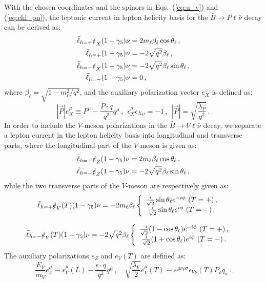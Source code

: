 \documentclass[prd,preprint,superscriptaddress,amsmath,amssymb]{revtex4}
\begin{document}
With the chosen coordinates and the spinors in Eqs.~(\ref{eq:u_v}) and (\ref{eq:chi_pn}),  the  leptonic current in lepton helicity basis for the $\bar B\to P \ell \bar\nu$ decay can be derived as: 
 \begin{align}
 \bar\ell_{h=+} \slashed{e}_X (1- \gamma_5)  \nu &= 2 m_\ell \beta_\ell \cos\theta_\ell\,, \nonumber \\
 \bar\ell_{h=+}  (1- \gamma_5)  \nu &= -2 \sqrt{q^2} \beta_\ell  \,, \nonumber  \\
 \bar\ell_{h=-} \slashed{e}_X (1- \gamma_5)  \nu &= -2 \sqrt{q^2} \beta_\ell \sin\theta_\ell\,, \nonumber \\
 \bar\ell_{h=-}  (1- \gamma_5)  \nu  &= 0\,,
 \end{align}
where $\beta_\ell = \sqrt{1 - m^2_\ell/q^2}$, and the auxiliary polarization vector $e_X$ is defined as:
\begin{equation}
|\vec{P}| e^\mu_X  \equiv  P^\mu - \frac{P\cdot q }{q^2} q^\mu\,, ~~\epsilon^\mu_X \epsilon_{X \mu} =-1 \,, ~~|\vec{P}|= \sqrt{\frac{\lambda_P}{q^2}} \,. \nonumber
 \end{equation} 
In order to include the $V$-meson polarizations in the $\bar B \to V \ell \bar\nu$ decay, we separate a lepton current  in the lepton helicity basis into  longitudinal and transverse parts, where the longitudinal part of the $V$-meson is given as: 
\begin{align}
  \bar\ell_{h=+} \slashed{e}_Z (1- \gamma_5)  \nu  &= 2m_\ell \beta_\ell  \cos\theta_\ell \,, \\
    \bar\ell_{h=-} \slashed{e}_Z (1- \gamma_5)  \nu &= - 2\sqrt{q^2} \beta_\ell \sin\theta_\ell\,, 
\end{align}
while the two transverse parts of the $V$-meson are respectively given as:
\begin{align}
\bar\ell_{h=+} \slashed{e}_{V}(T) (1- \gamma_5)  \nu  &=  -2 m_\ell \beta_\ell  \left\{
\begin{array}{c}
 \frac{i}{\sqrt{2}} \sin\theta_\ell  e^{-i \phi}  ~(T=+) \,,   \\
   \frac{i }{\sqrt{2}} \sin\theta_\ell  e^{i \phi}  ~ (T= -) \,,
  \end{array}
   \right.
\end{align}

\begin{align}
\bar\ell_{h=-} \slashed{e}_{V}(T) (1- \gamma_5)  \nu &=  -2\sqrt{q^2} \beta_\ell  \left\{
\begin{array}{c}
 \frac{- i }{\sqrt{2}} (1- \cos\theta_\ell)  e^{-i \phi}  ~(T=+) \,,   \\
   \frac{i }{\sqrt{2}} (1 + \cos\theta_\ell ) e^{i \phi}  ~ (T= -) \,.
  \end{array}
   \right.
\end{align}
The auxiliary polarizations $e_Z$ and $e_V(T)$ are defined as:
\begin{equation}
 \frac{E_{V}}{m_{V}} e^\mu_Z  \equiv \epsilon^\mu_V (L) - \frac{\epsilon \cdot q }{q^2} q^\mu \,, %
 \quad \sqrt{\frac{\lambda_{V}}{2}} e^\mu_{V}(T)  \equiv  \varepsilon^{\mu \nu \rho \sigma} \epsilon_{V\nu}(T) P_\rho q_\sigma\,. \nonumber
 \end{equation}
\end{document}
